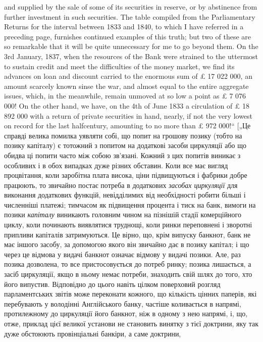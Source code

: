 {and supplied by the sale of some of its securities in reserve, or by abstinence from
further investment in such securities. The table compiled from the Parliamentary
Returns for the interval between 1833 and 1840, to which I have referred in a preceding page,
furnishes continued examples of this truth; but two of these are so
remarkable that it will be quite unnecessary for me to go beyond them. On the
3rd January, 1837, when the resources of the Bank were strained to the uttermost
to sustain credit and meet the difficulties of the money market, we find its advances on loan and
discount carried to the enormous sum of £ 17 022 000, an
amount scarcely known sinse the war, and almost equal to the entire aggregate
issues, which, in the meanwhile, remain unmoved at so low a point as £ 7 076 000!
On the other hand, we have, on the 4th of June 1833 a circulation of £ 18 892 000
with a return of private securities in hand, nearly, if not the very lowest on
record for the last halfcentury, amounting to no more than £ 972 000!“ [„Це справді
велика помилка уявляти собі, що попит на грошову позику (тобто на позику
капіталу) є тотожний з попитом на додаткові засоби циркуляції або що обидва
ці попити часто між собою зв’язані. Кожний з цих попитів виникає з особливих і в обох випадках дуже
різних обставин. Коли все має вигляд процвітання, коли заробітна плата висока, ціни підвищуються і
фабрики добре працюють, то звичайно постає потреба в додаткових \emph{засобах циркуляції} для виконання
додаткових функцій, невідділимих від необхідності робити більші і
численніші платежі; тимчасом як підвищення процента і тиск на банк, вимоги
на позики \emph{капіталу} виникають головним чином на пізнішій стадії комерційного циклу, коли починають
виявлятися труднощі, коли ринки переповнені
і зворотні припливи капіталів затримуються. Це вірно, що, крім випуску банкнот,
банк не має іншого засобу, за допомогою якого він звичайно дає в позику
капітал; і що через це відмова у видачі банкнот означає відмову у видачі позики.
Але, раз позика дозволена, то все пристосовується до потреб ринку; позика
лишається, а засіб циркуляції, якщо в ньому немає потреби, знаходить
свій шлях до того, хто його випустив. Відповідно до цього навіть цілком поверховий
розгляд парламентських звітів може переконати кожного, що кількість
цінних паперів, які перебувають у володінні Англійського банку, частіше коливається
в напрямі, протилежному до циркуляції його банкнот, ніж в одному
з нею напрямі, і, що, отже, приклад цієї великої установи не становить винятку
з тієї доктрини, яку так дуже обстоюють провінціальні банкіри, а саме доктрини,
}
